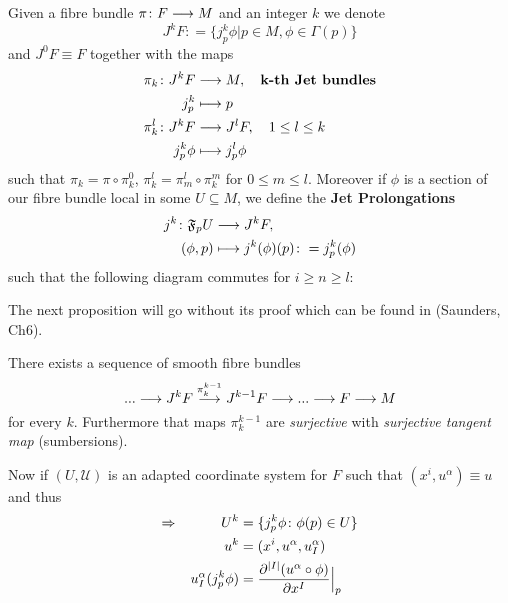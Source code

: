 \begin{definition}
  Given a fibre bundle $\pi\colon  F\longrightarrow M$ and an integer $k$ we denote
  $$ J^k F \colon = \{j^k_p \phi | p \in M, \phi \in \Gamma(p) \}$$
  and $J^0 F \equiv F$ together with the maps
  \begin{align*}
    \pi_k \colon  J^k F &\lra M, \quad \textbf{k-th Jet bundles}\\
    j^k_p &\lmap p \\
    \pi^l_k\colon  J^kF &\lra J^l F, \quad 1 \leq l \leq k \\
    j^k_p  \phi &\lmap j^l_p \phi
  \end{align*}
  such that $\pi_k = \pi \circ \pi^0_k$, $\pi^l_k = \pi^l_m \circ \pi^m_k$ for $0 \leq m \leq l$. Moreover if $\phi$ is a section of our fibre bundle local in some $U\subseteq M$, we define the \textbf{Jet Prolongations}
  \begin{align*}
    j^k\colon  \mathfrak{F}_p U &\lra J^k F,\\
    (\phi, p) &\lmap j^k(\phi)(p) \colon = j^k_p(\phi)
  \end{align*}
  such that the following diagram commutes for $i \geq n \geq l$:
  \begin{center}
  \end{center}
\end{definition}

The next proposition will go without its proof which can be found in (Saunders, Ch6). %

\begin{prop}
 There exists a sequence of smooth fibre bundles
 $$ ... \longrightarrow J^kF \overset{\pi^{k-1}_k}{\longrightarrow} J^{k-1}F \longrightarrow ... \longrightarrow F \longrightarrow M $$
 for every $k$. Furthermore that maps $\pi^{k-1}_k$ are \emph{surjective} with \emph{surjective tangent map} (sumbersions).
\end{prop}

Now if $(U, \mathcal{U})$ is an adapted coordinate system for $F$ such that $(x^i, u^\alpha) \equiv u$ and thus
\begin{align*}
  \Rightarrow \quad \quad \quad U^k &= \{j^k_p \phi \colon  \phi(p) \in U\}\\
  u^k &= (x^i, u^\alpha, u_I^\alpha)\\
  u^\alpha_I(j^k_p \phi) &= \dell{^{|I|} (u^\alpha \circ \phi)}{x^I}\Big|_p
\end{align*}

